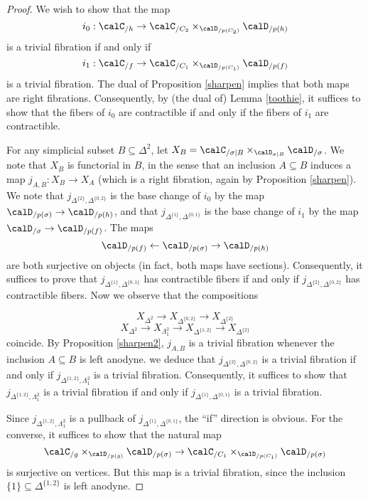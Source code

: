 \begin{proof}
We wish to show that the map
$$ i_0: \calC_{/h} \rightarrow \calC_{/C_2} \times_{ \calD_{/p(C_2)}} \calD_{/p(h)}$$ is a trivial fibration
if and only if $$ i_1: \calC_{ /f } \rightarrow \calC_{/C_1} \times_{ \calD_{/p(C_1)}} \calD_{/p(f)}$$ is a trivial fibration. The dual of Proposition \ref{sharpen} implies that both maps are right fibrations. Consequently, by (the dual of) Lemma \ref{toothie}, it suffices to show that the fibers of $i_0$ are contractible if and only if the fibers of $i_1$ are contractible. 

For any simplicial subset $B \subseteq \Delta^2$, let $X_B = \calC_{/\sigma|B} \times_{ \calD_{\sigma|B}} \calD_{/\sigma}$. We note that $X_B$ is functorial in $B$, in the sense that an inclusion 
$A \subseteq B$ induces a map $j_{A,B}: X_B \rightarrow X_A$ (which is a right fibration, again by Proposition \ref{sharpen}). We note that $j_{ \Delta^{ \{2\} }, \Delta^{ \{0,2\} }}$
is the base change of $i_0$ by the map $\calD_{/p(\sigma)} \rightarrow \calD_{/p(h)}$, and that $j_{ \Delta^{ \{1\} }, \Delta^{ \{0,1\} }}$ is the base change of $i_1$ by the map
$\calD_{/\sigma} \rightarrow \calD_{/p(f)}$.  The maps $$ \calD_{ /p(f)} \leftarrow \calD_{/p(\sigma)} \rightarrow \calD_{/p(h)}$$ are both surjective on objects (in fact, both maps have sections).
Consequently, it suffices to prove that
$j_{ \Delta^{ \{1\}}, \Delta^{ \{0,1\} }}$ has contractible fibers if and only if $j_{ \Delta^{ \{2\}}, \Delta^{ \{0,2\} }}$ has contractible fibers. Now we observe that the compositions

$$ X_{\Delta^2} \rightarrow X_{ \Delta^{ \{0,2\} }} \rightarrow X_{ \Delta^{ \{2\} }}$$
$$ X_{\Delta^2} \rightarrow X_{ \Lambda^{2}_{1} } \rightarrow X_{\Delta^{ \{1,2\} }}  \rightarrow X_{ \Delta^{ \{2\} }}$$ 
coincide. By Proposition \ref{sharpen2}, $j_{A,B}$ is a trivial fibration whenever the inclusion $A \subseteq B$ is left anodyne. we deduce that $j_{ \Delta^{ \{2\} }, \Delta^{ \{0,2\} } }$ is a trivial fibration if and only if
$j_{\Delta^{ \{1,2\} }, \Lambda^2_1}$ is a trivial fibration. Consequently, it suffices to show that $j_{ \Delta^{ \{1,2\} }, \Lambda^2_1}$ is a trivial fibration if and only if $j_{ \Delta^{ \{1\} }, \Delta^{ \{0,1\} }}$ is a trivial fibration.

Since $j_{ \Delta^{ \{1,2\} }, \Lambda^2_1}$ is a pullback of $j_{ \Delta^{ \{1\} }, \Delta^{ \{0,1\} }}$, the ``if'' direction is obvious. For the converse, it suffices to show that the natural map
$$\calC_{/g} \times_{ \calD_{ /p(g)} } \calD_{/ p(\sigma)} \rightarrow \calC_{/ C_1} \times_{ \calD_{/ p(C_1)} } \calD_{/p(\sigma)}$$ is surjective on vertices. But this map is a trivial fibration, since the inclusion $\{1\} \subseteq \Delta^{ \{1,2\} }$ is left anodyne.
\end{proof}

